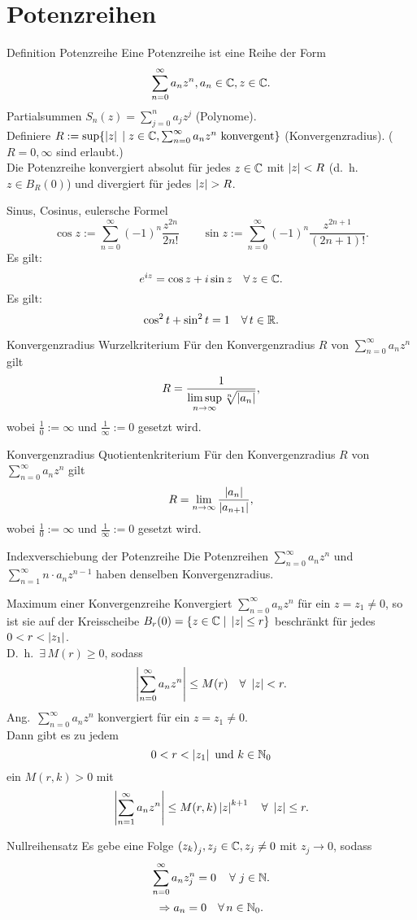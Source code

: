 \documentclass[main.tex]{subfiles}
\begin{document}
\section*{Potenzreihen}

\begin{karte}{Definition Potenzreihe}
    Eine Potenzreihe ist eine Reihe der Form
    \[ \sum_{n=0}^\infty a_n z^n, a_n \in\mathbb{C}, z \in\mathbb{C}. \]
    Partialsummen \( S_n(z) = \sum_{j=0}^n a_j z^j \) (Polynome).\\
    Definiere \( R:= \sup \{ \left| z \right| \;\vert \; z\in\mathbb{C}, 
    \sum_{n=0}^\infty a_n z^n \text{ konvergent} \} \)
    (Konvergenzradius). (\( R = 0, \infty \) sind erlaubt.)\\
    Die Potenzreihe konvergiert absolut für jedes \( z\in\mathbb{C} \) 
    mit \( \left| z \right| < R \) (d.\ h.\  \( z\in B_R(0) \)) 
    und divergiert für jedes \( \left| z \right| > R \).
\end{karte}
\begin{karte}{Sinus, Cosinus, eulersche Formel}
    \[ \cos z := \sum_{n=0}^\infty {(-1)}^n \frac{z^{2n}}{2n!} 
    \qquad \sin z  := \sum_{n=0}^\infty {(-1)}^n 
    \frac{z^{2n+1}}{(2n+1)!}. \]
    Es gilt:
    \[ e^{iz} = \cos z + i \sin z \quad \forall z\in\C. \]
    Es gilt:
    \[ \cos^2 t + \sin^2 t = 1 \quad \forall t \in \R. \]
\end{karte}
\begin{karte}{Konvergenzradius Wurzelkriterium}
    Für den Konvergenzradius \( R \) von 
    \( \sum_{n=0}^\infty a_n z^n \) gilt
    \[ R = \frac{1}{\limsup\limits_{n\rightarrow\infty} \sqrt[n]{\left| a_n \right|}}, \]
    wobei \(\frac{1}{0} := \infty \) und 
    \( \frac{1}{\infty} := 0 \) gesetzt wird.
\end{karte}
\begin{karte}{Konvergenzradius Quotientenkriterium}
    Für den Konvergenzradius \( R \) von 
    \( \sum_{n=0}^\infty a_n z^n \) gilt
    \[ R = \lim\limits_{n\rightarrow\infty} \frac{\left|  a_n  \right|}{\left|  a_{n+1}  \right|}, \]
    wobei \(\frac{1}{0} := \infty \) und 
    \( \frac{1}{\infty} := 0 \) gesetzt wird.
\end{karte}
\begin{karte}{Indexverschiebung der Potenzreihe}
    Die Potenzreihen \( \sum_{n=0}^\infty a_n z^n \) 
    und \( \sum_{n=1}^\infty n \cdot a_n z^{n-1} \) 
    haben denselben Konvergenzradius.
\end{karte}
\begin{karte}{Maximum einer Konvergenzreihe}
    Konvergiert \( \sum_{n=0}^\infty a_n z^n \) 
    für ein \( z = z_1 \neq 0 \), so ist sie auf 
    der Kreisscheibe \( B_r (0)  
    = \{ z\in\mathbb{C} \;\vert \; \left| z \right|\leq r \} \)
    beschränkt für jedes \( 0 < r < \left| z_1 \right| \).\\
    D.\ h.\  \( \exists \, M(r) \geq 0 \), sodass
    \[ \abs{ \sum_{n=0}^\infty a_n z^n } \leq M(r) 
    \quad \forall \, \abs{z} < r. \]
    Ang.\  \( \sum_{n=0}^\infty a_n z^n \) konvergiert 
    für ein \( z = z_1 \neq 0 \). \\
    Dann gibt es zu jedem
    \[ 0 < r < \left| z_1 \right| \text{ und } k\in\mathbb{N}_0\]
    ein \( M(r,k) > 0 \) mit
    \[ \abs{ \sum_{n=1}^\infty a_n z^n } 
    \leq M(r,k) \abs{z}^{k+1} \quad \forall \, \abs{z}\leq r. \]
\end{karte}
\begin{karte}{Nullreihensatz}
    Es gebe eine Folge \( {(z_k)}_j, z_j \in\mathbb{C}, z_j 
    \neq 0 \) mit \( z_j \rightarrow 0 \), sodass 
    \[ \sum_{n=0}^\infty a_n z_j^n = 0 \quad \,\forall \, j\in\N. \]
    \[ \Rightarrow a_n = 0 \quad \forall n\in\N_0. \]
\end{karte}
\end{document}
